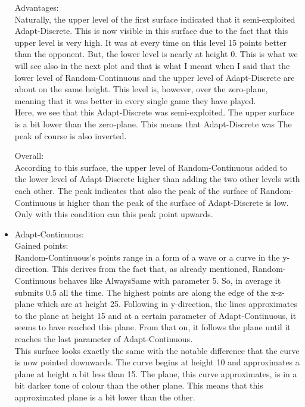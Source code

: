\documentclass{article}
\begin{document}
\begin{itemize}
		Advantages:\\
			Naturally, the upper level of the first surface indicated that it semi-exploited Adapt-Discrete.
			This is now visible in this surface due to the fact that this upper level is very high.
			It was at every time on this level 15 points better than the opponent.
			But, the lower level is nearly at height 0.
			This is what we will see also in the next plot and that is what I meant when I said that the lower level of Random-Continuous and the upper level of Adapt-Discrete are about on the same height.
			This level is, however, over the zero-plane, meaning that it was better in every single game they have played.\\
			Here, we see that this Adapt-Discrete was semi-exploited.
			The upper surface is a bit lower than the zero-plane.
			This means that Adapt-Discrete was 
			The peak of course is also inverted.

		Overall:\\
			According to this surface, the upper level of Random-Continuous added to the lower level of Adapt-Discrete higher than adding the two other levels with each other.
			The peak indicates that also the peak of the surface of Random-Continuous is higher than the peak of the surface of Adapt-Discrete is low.
			Only with this condition can this peak point upwards.
		
	 \item Adapt-Continuous:\\

		 Gained points:\\
		 	Random-Continuous's points range in a form of a wave or a curve in the y-direction.
			This derives from the fact that, as already mentioned, Random-Continuous behaves like AlwaysSame with parameter 5.
			So, in average it submits 0.5 all the time.
			The highest points are along the edge of the x-z-plane which are at height 25.
			Following in y-direction, the lines approximates to the plane at height 15 and at a certain parameter of Adapt-Continuous, it seems to have reached this plane.
			From that on, it follows the plane until it reaches the last parameter of Adapt-Continuous.\\
			This surface looks exactly the same with the notable difference that the curve is now pointed downwards.
			The curve begins at height 10 and approximates a plane at height a bit less than 15.
			The plane, this curve approximates, is in a bit darker tone of colour than the other plane.
			This means that this approximated plane is a bit lower than the other.


\end{itemize}
\end{document}
